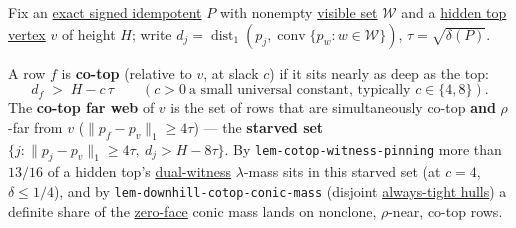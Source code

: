 \hypertarget{def:co-top}{}%
\begin{definition}\label{def:co-top}
Fix an \hyperref[def:signed-idempotent]{exact signed idempotent} $P$ with nonempty
\hyperref[def:visible-set]{visible set} $\mathcal W$ and a \hyperref[def:height]{hidden top vertex} $v$ of height
$H$; write $d_j=\operatorname{dist}_1(p_j,\operatorname{conv}\{p_w:w\in\mathcal W\})$,
$\tau=\sqrt{\delta(P)}$.

A row $f$ is \textbf{co-top} (relative to $v$, at slack $c$) if it sits nearly as deep as the top:
\[d_f\;>\;H-c\,\tau\qquad(c>0\ \text{a small universal constant, typically }c\in\{4,8\}).\]
The \textbf{co-top far web} of $v$ is the set of rows that are simultaneously co-top \textbf{and} $\rho$-far
from $v$ ($\lVert p_f-p_v\rVert_1\ge4\tau$) --- the \textbf{starved set}
$\{j:\lVert p_j-p_v\rVert_1\ge4\tau,\ d_j>H-8\tau\}$. By \texttt{lem-\allowbreak{}cotop-\allowbreak{}witness-\allowbreak{}pinning} more than
$13/16$ of a hidden top's \hyperref[def:dual-witness]{dual-witness} $\lambda$-mass sits in this starved set
(at $c=4$, $\delta\le1/4$), and by \texttt{lem-\allowbreak{}downhill-\allowbreak{}cotop-\allowbreak{}conic-\allowbreak{}mass} (disjoint
\hyperref[def:actor-hull]{always-tight hulls}) a definite share of the \hyperref[def:zero-face]{zero-face} conic mass
lands on nonclone, $\rho$-near, co-top rows.
\end{definition}
